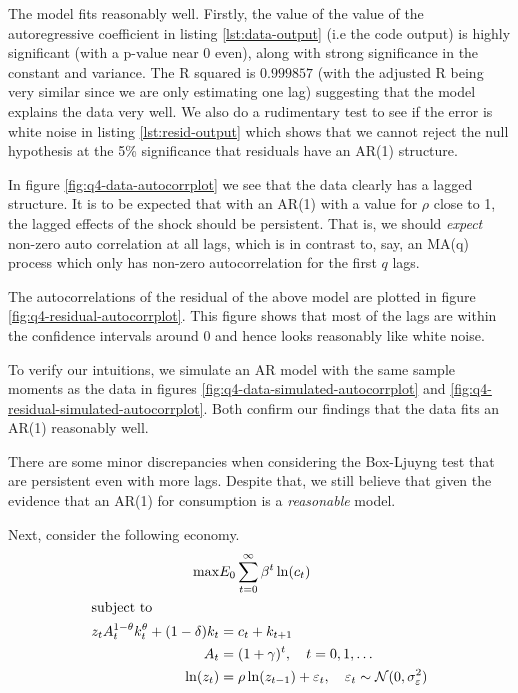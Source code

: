 \documentclass[11pt]{article}
\begin{document}
\begin{enumerate}
The model fits reasonably well. Firstly, the value of the value of the autoregressive coefficient in listing \ref{lst:data-output} (i.e the code output) is highly significant (with a p-value near 0 even), along with strong significance in the constant and variance. The R squared is \( 0.999857 \) (with the adjusted R being very similar since we are only estimating one lag) suggesting that the model explains the data very well. We also do a rudimentary test to see if the error is white noise in listing \ref{lst:resid-output} which shows that we cannot reject the null hypothesis at the 5\% significance that residuals have an AR(1) structure.

In figure \ref{fig:q4-data-autocorrplot} we see that the data clearly has a lagged structure. It is to be expected that with an AR(1) with a value for \( \rho \) close to 1, the lagged effects of the shock should be persistent. That is, we should {\itshape expect} non-zero auto correlation at all lags, which is in contrast to, say, an MA(q) process which only has non-zero autocorrelation for the first \( q \) lags. 

The autocorrelations of the residual of the above model are plotted in figure \ref{fig:q4-residual-autocorrplot}. This figure shows that most of the lags are within the confidence intervals around 0 and hence looks reasonably like white noise.

To verify our intuitions, we simulate an AR model with the same sample moments as the data in figures \ref{fig:q4-data-simulated-autocorrplot} and \ref{fig:q4-residual-simulated-autocorrplot}. Both confirm our findings that the data fits an AR(1) reasonably well.

There are some minor discrepancies when considering the Box-Ljuyng test that are persistent even with more lags. Despite that, we still believe that given the evidence that an AR(1) for consumption is a {\itshape reasonable} model.

\newpage
Next, consider the following economy.
\begin{align*}
\max & E_0 \sum^\infty_{t = 0}\beta^t \ln (c_t)\\
\intertext{subject to}
z_t A_t^{1 - \theta} k_t^\theta + (1 - \delta)k_t &= c_t + k_{t + 1}\\
A_t &= (1 + \gamma)^t, \quad t = 0, 1, \ldots \\
\ln(z_t) &= \rho \ln (z_{t - 1}) + \varepsilon_t,\quad \varepsilon_t \sim \mathcal{N}(0, \sigma^2_\varepsilon)
\end{align*}


\end{enumerate}
\end{document}
